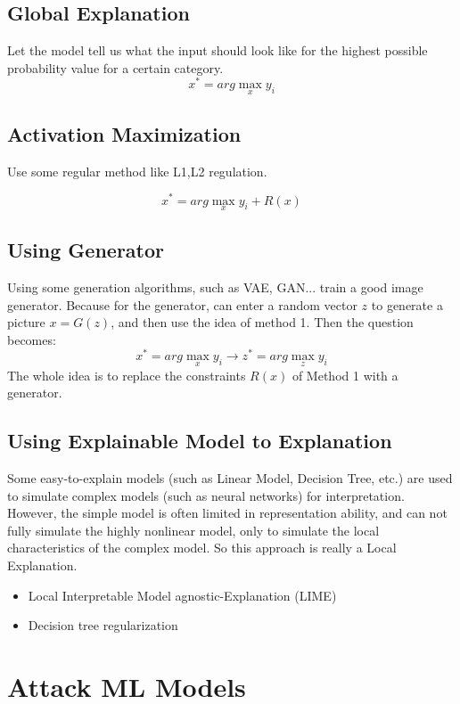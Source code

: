 \documentclass{article}
\begin{document}
\subsection{Global Explanation}

Let the model tell us what the input should look like for the highest possible probability value for a certain category.
$$
x^* = arg \max_{x} y_i
$$

\subsection{Activation Maximization}

Use some regular method like L1,L2 regulation.

$$
x^* = arg \max_x y_i + R(x)
$$

\subsection{Using Generator}

Using some generation algorithms, such as VAE, GAN... train a good image generator. Because for the generator, can enter a random vector $z$ to generate a picture $x = G(z)$, and then use the idea of method 1. Then the question becomes:
$$
x^* = arg \max_x y_i \to z^* = arg \max_z y_i
$$
The whole idea is to replace the constraints $R(x)$ of Method 1 with a generator.


\subsection{Using Explainable Model to Explanation}

Some easy-to-explain models (such as Linear Model, Decision Tree, etc.) are used to simulate complex models (such as neural networks) for interpretation. However, the simple model is often limited in representation ability, and can not fully simulate the highly nonlinear model, only to simulate the local characteristics of the complex model. So this approach is really a Local Explanation.

\begin{itemize}
    \item Local Interpretable Model agnostic-Explanation (LIME)
    \item Decision tree regularization
\end{itemize}

\section{Attack ML Models}
\end{document}
